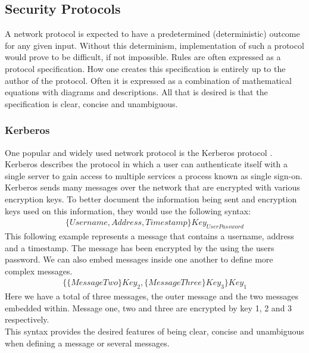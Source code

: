 \subsection{Security Protocols}
A network protocol is expected to have a predetermined (deterministic) outcome for any given input. Without this determinism, implementation of such a protocol would prove to be difficult, if not impossible. Rules are often expressed as a protocol specification. How one creates this specification is entirely up to the author of the protocol. Often it is expressed as a combination of mathematical equations with diagrams and descriptions.  All that is desired is that the specification is clear, concise and unambiguous.
\subsubsection{Kerberos}
One popular and widely used network protocol is the Kerberos protocol \cite{steiner1988kerberos}. Kerberos describes the protocol in which a user can authenticate itself with a single server to gain access to multiple services a process known as single sign-on. Kerberos sends many messages over the network that are encrypted with various encryption keys. To better document the information being sent and encryption keys used on this information, they would use the following syntax:
$$
\begin{multlined}
 \{Username, Address, Timestamp\}Key_{UserPassword}
\end{multlined}
$$
This following example represents a message that contains a username, address and a timestamp. The message has been encrypted by the using the users password. We can also embed messages inside one another to define more complex messages.
$$
\begin{multlined}
 \{\{MessageTwo\}Key_{2}, \{MessageThree\}Key_{3}\}Key_1
\end{multlined}
$$
Here we have a total of three messages, the outer message and the two messages embedded within. Message one, two and three are encrypted by key 1, 2 and 3 respectively.
\\
This syntax provides the desired features of being clear, concise and unambiguous when defining  a message or several messages.

